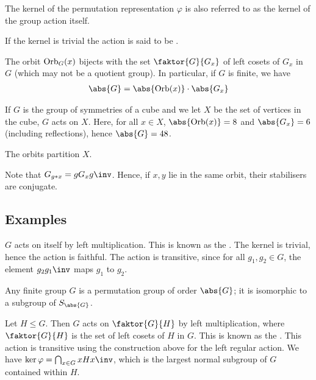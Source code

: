 \begin{remark}
	The kernel of the permutation representation $\varphi$ is also referred to as the kernel of the group action itself.
\end{remark} 

\begin{definition}
	If the kernel is trivial the action is said to be .
\end{definition} 

\begin{theorem}
	The orbit $\operatorname{Orb}_G(x)$ bijects with the set $\faktor{G}{G_x}$ of left cosets of $G_x$ in $G$ (which may not be a quotient group).
	In particular, if $G$ is finite, we have
	\begin{align*}
		\abs{G} = \abs{\Orb(x)} \cdot \abs{G_x}
	\end{align*}
\end{theorem}

\begin{example}
	If $G$ is the group of symmetries of a cube and we let $X$ be the set of vertices in the cube, $G$ acts on $X$.
	Here, for all $x \in X$, $\abs{\Orb(x)} = 8$ and $\abs{G_x} = 6$ (including reflections), hence $\abs{G} = 48$.
\end{example}

\begin{remark}
	The orbits partition $X$.

	Note that $G_{g \ast x} = g G_x g\inv$.
	Hence, if $x, y$ lie in the same orbit, their stabilisers are conjugate.
\end{remark}

\subsection{Examples}
\begin{example}
	$G$ acts on itself by left multiplication.
	This is known as the .
	The kernel is trivial, hence the action is faithful.
	The action is transitive, since for all $g_1, g_2 \in G$, the element $g_2 g_1\inv$ maps $g_1$ to $g_2$.
\end{example}

\begin{theorem}
	Any finite group $G$ is a permutation group of order $\abs{G}$; it is isomorphic to a subgroup of $S_\abs{G}$.
\end{theorem}

\begin{example}
	Let $H \leq G$.
	Then $G$ acts on $\faktor{G}{H}$ by left multiplication, where $\faktor{G}{H}$ is the set of left cosets of $H$ in $G$.
	This is known as the .
	This action is transitive using the construction above for the left regular action.
	We have $\ker\varphi = \bigcap_{x \in G} xHx\inv$, which is the largest normal subgroup of $G$ contained within $H$.
\end{example}

